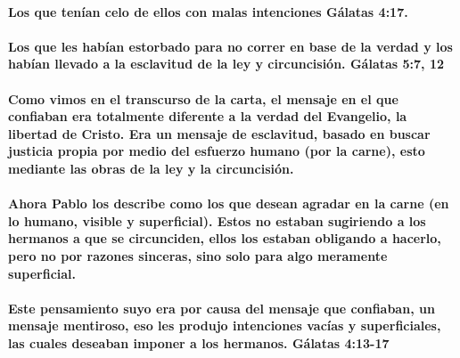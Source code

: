 \documentclass[11a pt,twoside]{article}
\let\oldparagraph\paragraph
\renewcommand{\paragraph}{\needspace{3\baselineskip}\oldparagraph}
\begin{document}
\paragraph{Los que tenían celo de ellos con malas intenciones Gálatas
4:17.}\label{los-que-tenuxedan-celo-de-ellos-con-malas-intenciones-guxe1latas-417.}

\paragraph{Los que les habían estorbado para no correr en base de la
verdad y los habían llevado a la esclavitud de la ley y circuncisión.
Gálatas 5:7,
12}\label{los-que-les-habuxedan-estorbado-para-no-correr-en-base-de-la-verdad-y-los-habuxedan-llevado-a-la-esclavitud-de-la-ley-y-circuncisiuxf3n.-guxe1latas-57-12}

\paragraph{Como vimos en el transcurso de la carta, el mensaje en el que
confiaban era totalmente diferente a la verdad del Evangelio, la
libertad de Cristo. Era un mensaje de esclavitud, basado en buscar
justicia propia por medio del esfuerzo humano (por la carne), esto
mediante las obras de la ley y la
circuncisión.}\label{como-vimos-en-el-transcurso-de-la-carta-el-mensaje-en-el-que-confiaban-era-totalmente-diferente-a-la-verdad-del-evangelio-la-libertad-de-cristo.-era-un-mensaje-de-esclavitud-basado-en-buscar-justicia-propia-por-medio-del-esfuerzo-humano-por-la-carne-esto-mediante-las-obras-de-la-ley-y-la-circuncisiuxf3n.}

\paragraph{Ahora Pablo los describe como los que desean agradar en la
carne (en lo humano, visible y superficial). Estos no estaban sugiriendo
a los hermanos a que se circunciden, ellos los estaban obligando a
hacerlo, pero no por razones sinceras, sino solo para algo meramente
superficial.}\label{ahora-pablo-los-describe-como-los-que-desean-agradar-en-la-carne-en-lo-humano-visible-y-superficial.-estos-no-estaban-sugiriendo-a-los-hermanos-a-que-se-circunciden-ellos-los-estaban-obligando-a-hacerlo-pero-no-por-razones-sinceras-sino-solo-para-algo-meramente-superficial.}

\paragraph{Este pensamiento suyo era por causa del mensaje que
confiaban, un mensaje mentiroso, eso les produjo intenciones vacías y
superficiales, las cuales deseaban imponer a los hermanos. Gálatas
4:13-17}\label{este-pensamiento-suyo-era-por-causa-del-mensaje-que-confiaban-un-mensaje-mentiroso-eso-les-produjo-intenciones-vacuxedas-y-superficiales-las-cuales-deseaban-imponer-a-los-hermanos.-guxe1latas-413-17}
\end{document}
